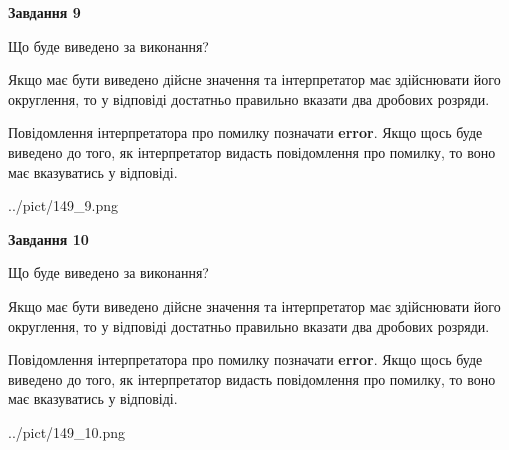 \documentclass[12pt, ukrainian]{article}
\begin{document}
{\begin {Large}
{\begin {center}\textbf{Завдання 9}\end {center}}\par
Що буде виведено за виконання? \par

Якщо має бути виведено дійсне значення та інтерпретатор має здійснювати його округлення, 
то у відповіді достатньо правильно вказати два дробових розряди.

Повідомлення інтерпретатора про помилку позначати \textbf{error}.
Якщо щось буде виведено до того, як інтерпретатор видасть повідомлення про помилку, 
то воно має вказуватись у відповіді. \par

\begin{center}
	{../pict/149_9.png}
\end{center}
\newpage

{\begin {center}\textbf{Завдання 10}\end {center}}\par
Що буде виведено за виконання? \par

Якщо має бути виведено дійсне значення та інтерпретатор має здійснювати його округлення, 
то у відповіді достатньо правильно вказати два дробових розряди.

Повідомлення інтерпретатора про помилку позначати \textbf{error}.
Якщо щось буде виведено до того, як інтерпретатор видасть повідомлення про помилку, 
то воно має вказуватись у відповіді. \par

\begin{center}
	{../pict/149_10.png}
\end{center}
\newpage

\end {Large}}
\end{document}
